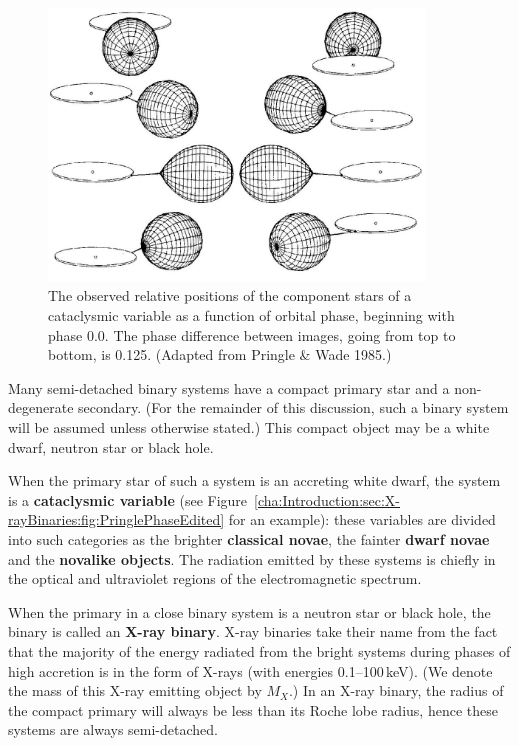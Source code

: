 \begin{figure}[htb]
\begin{center}
\includegraphics[width=10.0cm]{PringlePhaseEdited}
\caption{%
The observed relative positions of the component stars of a cataclysmic variable
as a function of orbital phase, beginning with phase 0.0. The
phase difference between images, going from top to bottom, is
0.125. (Adapted from %
Pringle \& Wade 1985.)%
}\label{cha:Introduction:sec:X-rayBinaries:fig:PringlePhaseEdited}
\end{center}
\end{figure}
\nocite{PringleWade:1985} %

Many semi-detached binary systems have a compact primary star and a
non-degenerate secondary. (For the remainder of this discussion, such a
binary system will be assumed unless otherwise stated.) This compact
object may be a white dwarf, neutron star or black hole.

\vspace{\myparskip}

When the primary star of such a system is an accreting white dwarf, the system is a \textbf{cataclysmic variable} (see Figure~\vref{cha:Introduction:sec:X-rayBinaries:fig:PringlePhaseEdited} for an example): these variables are divided into such categories as the brighter \textbf{classical
  novae}, the fainter \textbf{dwarf novae}\label{cha:Introduction:sec:X-rayBinaries:subsec:CompactObjects:topic:DwarfNovae}%
 and the \textbf{novalike objects}. %
The radiation emitted by these systems is chiefly in the optical and ultraviolet regions
of the electromagnetic spectrum. %

When the primary in a close binary system is a neutron star or
black hole, the binary is called an \textbf{X-ray binary}.
X-ray binaries take their name from the fact that the majority of
the energy radiated from the bright systems during phases of high accretion is in the form of X-rays (with
energies 0.1--100\,keV). (We denote the mass of this X-ray emitting object by $M_{X}$.) In an X-ray binary, the radius of the compact primary will always be
less than its Roche lobe radius, hence these systems are
always semi-detached.


